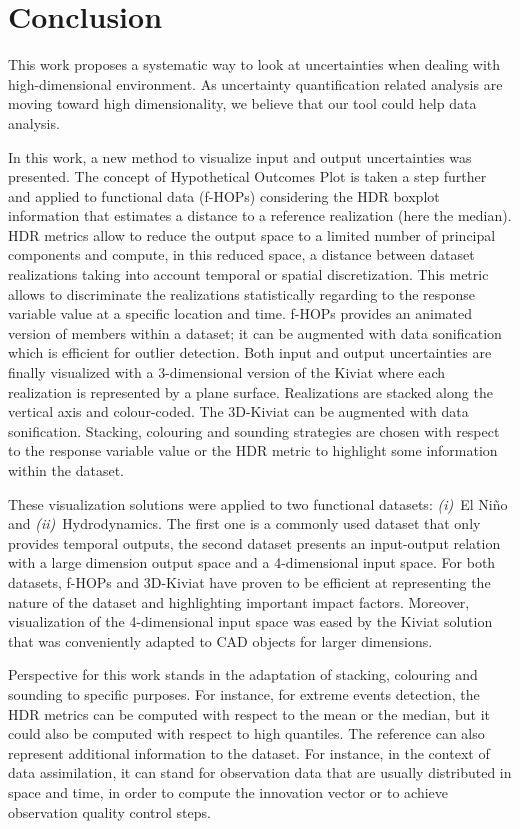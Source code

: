 \section{Conclusion}\label{sec:visu_ccl}

This work proposes a systematic way to look at uncertainties when dealing with high-dimensional environment. As uncertainty quantification related analysis are moving toward high dimensionality, we believe that our tool could help data analysis.

In this work, a new method to visualize input and output uncertainties  was presented. The concept of Hypothetical Outcomes Plot is taken a step further and applied to functional data (f-HOPs) considering the HDR boxplot information that estimates a distance to a reference realization (here the median). HDR metrics allow to reduce the output space to a limited number of principal components and compute, in this reduced space, a distance between dataset realizations taking into account temporal or spatial discretization. This metric allows to discriminate the realizations statistically regarding to the response variable value at a specific location and time. f-HOPs provides an animated version of members within a dataset; it can be augmented with data sonification which is efficient for outlier detection. Both input and output uncertainties are finally visualized with a 3-dimensional version of the Kiviat where each realization is represented by a plane surface. Realizations are stacked along the vertical axis and colour-coded. The 3D-Kiviat can be augmented with data sonification. Stacking, colouring and sounding strategies are chosen with respect to the response variable value or the HDR metric to highlight some information within the dataset.  

These visualization solutions were applied to two functional datasets: \emph{(i)}~El Niño and \emph{(ii)}~Hydrodynamics. The first one is a commonly used dataset that only provides temporal outputs, the second dataset presents an input-output relation with a large dimension output space and a 4-dimensional input space. For both datasets, f-HOPs and 3D-Kiviat have proven to be efficient at representing the nature of the dataset and highlighting important impact factors. Moreover, visualization of the 4-dimensional input space was eased by the Kiviat solution that was conveniently adapted to CAD objects for larger dimensions. 

Perspective for this work stands in the adaptation of stacking, colouring and sounding to specific purposes. For instance, for extreme events detection, the HDR metrics can be computed with respect to the mean or the median, but it could also be computed with respect to high quantiles.
The reference can also represent additional information to the dataset. For instance, in the context of data assimilation, it can stand for observation data that are usually distributed in space and time, in order to compute the innovation vector or to achieve observation quality control steps.

